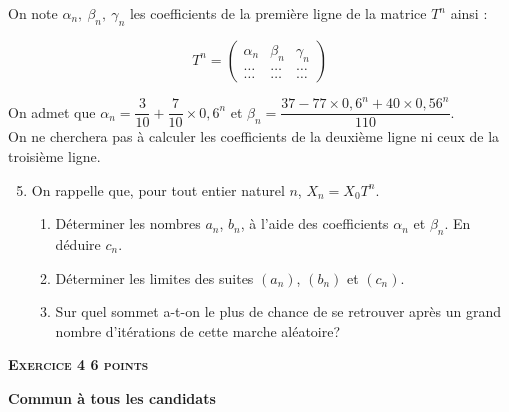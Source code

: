 \documentclass[10pt]{article}
\begin{document}
On note $\alpha_n,\:\beta_n,\:\gamma_n$ les coefficients de la première ligne de la matrice $T^n$ ainsi :
		
\[T^n = \begin{pmatrix}\alpha_n&\beta_n&\gamma_n\\\ldots&\ldots&\ldots\\\ldots&\ldots&\ldots\end{pmatrix}\]

On admet que $\alpha_n = \dfrac{3}{10} + \dfrac{7}{10} \times 0,6^n$ et $\beta_n = \dfrac{37 - 77 \times 0,6^n + 40 \times 0,56^n}{110}$.\\[5pt]
On ne cherchera pas à calculer les coefficients de la deuxième ligne ni ceux de la troisième ligne.

	\begin{enumerate}
	\setcounter{enumi}{4}
\item  On rappelle que, pour tout entier naturel $n$,\: $X_n = X_0T^n$.
	\begin{enumerate}
		\item Déterminer les nombres $a_n$,\: $b_n$, à l'aide des coefficients $\alpha_n$ et $\beta_n$. En déduire $c_n$.
		\item Déterminer les limites des suites $\left(a_n\right)$,\: $\left(b_n\right)$ et $\left(c_n\right)$.
		\item Sur quel sommet a-t-on le plus de chance de se retrouver après un grand nombre d'itérations de cette marche aléatoire?
	\end{enumerate}
\end{enumerate}

\vspace{0,5cm}

\textbf{\textsc{Exercice 4 \hfill 6 points}}

\textbf{Commun à tous les candidats} 

\medskip
\end{document}
